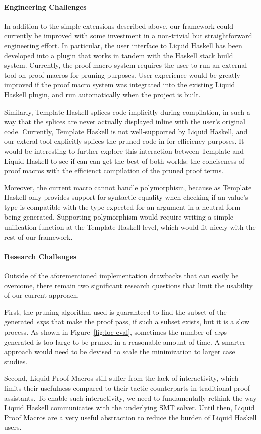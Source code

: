 \paragraph{Engineering Challenges}

In addition to the simple extensions described above, our framework
could currently be improved with some investment in a non-trivial but
straightforward engineering effort. In particular, the user interface
to Liquid Haskell has been developed into a plugin that works in
tandem with the Haskell stack build system. Currently, the proof macro
system requires the user to run an external tool on proof macros for
pruning purposes. User experience would be greatly improved if
the proof macro system was integrated into the existing Liquid Haskell
plugin, and run automatically when the project is built.

Similarly, Template Haskell splices code implicitly during
compilation, in such a way that the splices are never actually
displayed inline with the user's original code.  Currently, Template
Haskell is not well-supported by Liquid Haskell, and our exteral tool
explicitly splices the pruned code in for efficiency purposes.  It
would be interesting to further explore this interaction between
Template and Liquid Haskell to see if can can get the best of both
worlds: the conciseness of proof macros with the efficienct
compilation of the pruned proof terms.

Moreover, the current  macro cannot handle polymorphism,
because as Template Haskell only provides support for syntactic
equality when checking if an value's type is compatible with the type
expected for an argument in a neutral form being generated. Supporting
polymorphism would require writing a simple unification function at
the Template Haskell level, which would fit nicely with the rest of
our framework.

\paragraph{Research Challenges}

Outside of the aforementioned implementation drawbacks that can easily
be overcome, there remain two significant research questions that
limit the usability of our current approach. 

First, the pruning algorithm used is guaranteed to find the subset of
the -generated \textit{exp}s that make the proof pass, if
such a subset exists, but it is a slow process. As shown in
Figure~\ref{fig:loc-eval}, sometimes the number of \textit{exp}s
generated is too large to be pruned in a reasonable amount of time. A
smarter approach would need to be devised to scale the minimization to
larger case studies.

Second, Liquid Proof Macros still suffer from the lack of
interactivity, which limits their usefulness compared to their tactic
counterparts in traditional proof assistants. To enable such
interactivity, we need to fundamentally rethink the way Liquid Haskell
communicates with the underlying SMT solver. Until then, Liquid Proof
Macros are a very useful abstraction to reduce the burden of Liquid
Haskell users.
